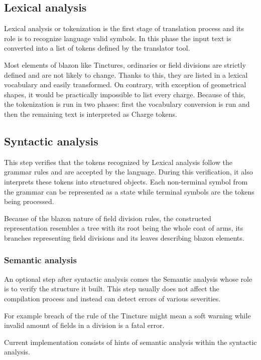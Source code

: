 \documentclass[12pt,a4paper]{article}
\begin{document}
\subsection{Lexical analysis} 
Lexical analysis or tokenization is the first stage of translation process and its role is to recognize language valid symbols.
In this phase the input text is converted into a list of tokens defined by the translator tool.

Most elements of blazon like Tinctures, ordinaries or field divisions are strictly defined and are not likely to change. 
Thanks to this, they are listed in a lexical vocabulary and easily transformed.
On contrary, with exception of geometrical shapes, it would be practically impossible to list every charge. Because of this, the tokenization is run in two phases: first the vocabulary conversion is run and then the remaining text is interpreted as Charge tokens.



\subsection{Syntactic analysis} 
This step verifies that the tokens recognized by Lexical analysis follow the grammar rules and are accepted by the language. During this verification, it also interprets these tokens into structured objects.
Each non-terminal symbol from the grammar can be represented as a state while terminal symbols are the tokens being processed.

Because of the blazon nature of field division rules, the constructed representation resembles a tree with its root being the whole coat of arms, its branches representing field divisions and its leaves describing blazon elements.

\subsubsection{Semantic analysis} 
An optional step after syntactic analysis comes the Semantic analysis whose role is to verify the structure it built.
This step usually does not affect the compilation process and instead can detect errors of various severities.

For example breach of the rule of the Tincture might mean a soft warning while invalid amount of fields in a division is a fatal error.

Current implementation consists of hints of semantic analysis within the syntactic analysis.
\end{document}
